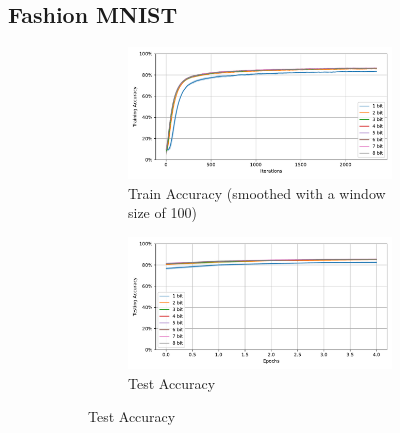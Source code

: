     \subsection{Fashion MNIST}
    \label{appendix:accuracy_curves_fashion_mnist}
        \begin{figure}[H]
            \centering
            \begin{subfigure}[H]{0.69\textwidth}
                \centering
                \begin{subfigure}[H]{\textwidth}
                    \centering
                    \includegraphics[width=\textwidth]{../standard/FashionMNIST/plots/fashionmnist_train_acc.pdf}
                    \caption{Train Accuracy (smoothed with a window size of 100)}
                \end{subfigure}
                \hfill
                \begin{subfigure}[H]{\textwidth}
                    \centering
                    \includegraphics[width=\textwidth]{../standard/FashionMNIST/plots/fashionmnist_test_acc.pdf}
                    \caption{Test Accuracy}
                \end{subfigure}
            \end{subfigure}
            \hfill
            \begin{subfigure}[H]{0.3\textwidth}

\end{subfigure}
\end{figure}
